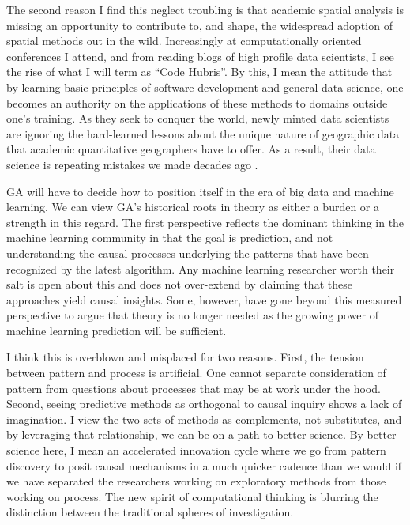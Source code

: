 \documentclass[11pt]{article}
\begin{document}
The second reason I find this neglect troubling is that academic spatial
analysis is missing an opportunity to contribute to, and shape, the widespread
adoption of spatial methods out in the wild. Increasingly at computationally
oriented conferences I attend, and from reading blogs of high profile data
scientists, I see the rise of what I will term as ``Code Hubris''. By this, I
mean the attitude that by learning basic principles of software development and
general data science, one becomes an authority on the applications of these
methods to domains outside one's training. As they seek to conquer the world,
newly minted data scientists are ignoring the hard-learned lessons about the
unique nature of geographic data that academic quantitative geographers have to
offer. As a result, their data science is repeating mistakes we made decades ago
\cite{Arribas_Bel_2018}.

GA will have to decide how to position itself in the era of big data and machine
learning. We can view GA's historical roots in theory \cite{Golledge_2010}  as either a burden or a strength in this regard. The first perspective
reflects the dominant thinking in the machine learning community in that the
goal is prediction, and not understanding the causal processes underlying the
patterns that have been recognized by the latest algorithm. Any machine learning
researcher worth their salt is open about this and does not over-extend by
claiming that these approaches yield causal insights. Some, however, have gone
beyond this measured perspective to argue that theory is no longer needed as the
growing power of machine learning prediction will be
sufficient\cite{anserson_2006_eot}.

I think this is overblown and misplaced for two reasons. First, the tension
between pattern and process is artificial. One cannot separate consideration of
pattern from questions about processes that may be at work under the hood.
Second, seeing predictive methods as orthogonal to causal inquiry shows a lack
of imagination. I view the two sets of methods as complements, not substitutes,
and by leveraging that relationship, we can be on a path to better science.
By better science here, I mean an accelerated innovation cycle where we go
from pattern discovery to posit causal mechanisms in a much quicker cadence than
we would if we have separated the researchers working on exploratory methods
from those working on process. The new spirit of computational thinking is
blurring the distinction between the traditional spheres of investigation.
\end{document}
